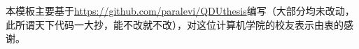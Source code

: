\begin{thanks}
本模板主要基于\url{https://github.com/paralevi/QDUthesis}编写（大部分均未改动，此所谓天下代码一大抄，能不改就不改），对这位计算机学院的校友表示由衷的感谢。
\end{thanks}